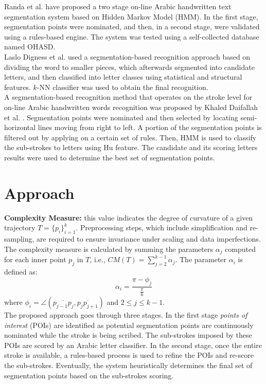 \documentclass[10pt, conference, compsocconf]{IEEEtran}
\begin{document}
Randa et al. \cite{elanwar2012unconstrained} have proposed a two stage on-line Arabic handwritten text segmentation system based on Hidden Markov Model (HMM). 
In the first stage, segmentation points were nominated, and then, in a second stage, were validated using a rules-based engine. 
The system was tested using a self-collected database named OHASD.\\

Laslo Digness et al. \cite{Dinges2011} used a segmentation-based recognition approach based on dividing the word to smaller pieces, which afterwards segmented into candidate letters, and then classified into letter classes using statistical and structural features. 
$k$-NN classifier was used to obtain the final recognition.\\

A segmentation-based recognition method that operates on the stroke level for on-line Arabic handwritten words recognition was proposed by Khaled Daifallah et al. \cite{daifallah2009recognition}. 
Segmentation points were nominated and then selected by locating semi-horizontal lines moving from right to left. 
A portion of the segmentation points is filtered out by applying on a certain set of rules. 
Then, HMM is used to classify the sub-strokes to letters using Hu feature. 
The candidate and its scoring letters results were used to determine the best set of segmentation points.\\


\section{Approach}
\label{sec:approach}

\textbf{Complexity Measure:} this value indicates the degree of curvature of a given trajectory $T=\{p_i\}_{i=1}^{k}$. 
Preprocessing steps, which include simplification and re-sampling, are required to ensure invariance under scaling and data imperfections. 
The complexity measure is calculated by summing the parameters $\alpha_{j}$ computed for each inner point $p_j$ in $T$, i.e., $CM(T)=\sum_{j=2}^{k-1}{\alpha_j}$.
The parameter $\alpha_{i}$ is defined as:
\begin{equation}
\alpha_{i}=\frac{\pi-\phi_{j}}{\frac{\pi}{6}}
\end{equation}
where $\phi_i=\angle(\overline{p_{j-1}p_{j}},\overline{p_{j}p_{j+1}})$ and $2\leq j \leq k-1$.\\

The proposed approach goes through three stages. In the first stage \emph{points of interest} (POIs) are identified as potential segmentation points are continuously nominated while the stroke is being scribed. The sub-strokes imposed by these POIs are scored by an Arabic letter classifier. In the second stage, once the entire stroke is available, a rules-based process is used to refine the POIs and re-score the sub-strokes. Eventually, the system heuristically determines the final set of segmentation points based on the sub-strokes scoring.\\
\end{document}
